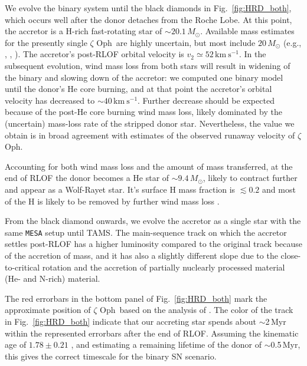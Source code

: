 \documentclass[twocolumn,twocolappendix,trackchanges]{aastex63}
\newcommand{\kms}{{\mathrm{km\ s^{-1}}}}
\DeclareRobustCommand{\Figref}[1]{Fig.~\ref{#1}}
\newcommand{\zoph}{$\zeta$ Oph}
\begin{document}
We evolve the binary system until the black diamonds in
\Figref{fig:HRD_both}, which occurs well after the donor detaches from
the Roche Lobe. At this point, the accretor is a H-rich fast-rotating
star of
$\sim$$20.1\,M_\odot$. Available mass estimates for the presently single \zoph\ are highly uncertain, but most include
$20\,M_\odot$ (e.g., \citealt{hoogerwerf:01}, , \citealt{neuhauser:20}). The accretor's post-RLOF orbital velocity is
$v_2\simeq52\,\kms$. In the subsequent evolution, wind mass loss from both stars will result in  widening of the binary and slowing down of the accretor: we computed one binary model until the donor's He core burning, and at that point the accretor's orbital velocity has decreased to
$\sim$$40\,\kms$. Further decrease should be expected because of the
post-He core burning wind mass loss, likely dominated by the
(uncertain) mass-loss rate of the stripped donor star. Nevertheless,
the value we obtain is in broad agreement with estimates of the
observed runaway velocity of \zoph.

Accounting for both wind mass loss and the amount of mass transferred, at the end of RLOF the donor becomes a He star of
$\sim$$9.4\,M_\odot$, likely to contract further and appear as a
Wolf-Rayet star. It's surface H mass fraction is $\lesssim 0.2$ and
most of the H is likely to be removed by further wind mass loss
\citep[e.g.,][]{gotberg:17}.

From the black diamond onwards, we evolve the accretor as a single star with the same \texttt{MESA} setup until TAMS. The main-sequence track on which the accretor settles post-RLOF has a higher luminosity compared to the original track because of the accretion of mass, and it has also a slightly different slope due to the close-to-critical rotation and the accretion of partially nuclearly processed material (He- and N-rich) material.

The red errorbars in the bottom panel of \Figref{fig:HRD_both} mark the approximate position of \zoph\ based on the analysis of . The color of the track in \Figref{fig:HRD_both} indicate that our accreting star spends about
$\sim$2\,Myr within the represented errorbars after the end of RLOF. Assuming the kinematic age of
$1.78\pm0.21$ \citep{neuhauser:20}, and estimating a remaining lifetime of the donor of
$\sim$0.5\,Myr, this gives the correct timescale for the binary SN scenario.
\end{document}
